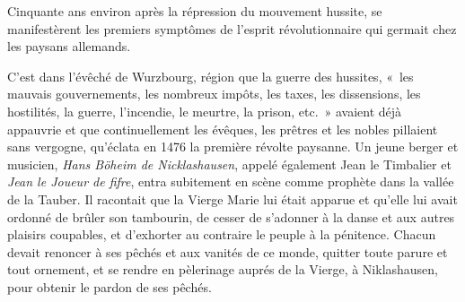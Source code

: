 \documentclass[french,twoside]{book} %
\newcommand\chaptercont{} %
\begin{document}
\chaptercont
\noindent Cinquante ans environ après la répression du mouvement hussite, se manifestèrent les premiers symptômes de l’esprit révolutionnaire qui germait chez les paysans allemands.\par
C’est dans l’évêché de Wurzbourg, région que la guerre des hussites, « les mauvais gouvernements, les nombreux impôts, les taxes, les dissensions, les hostilités, la guerre, l’incendie, le meurtre, la prison, etc. » avaient déjà appauvrie et que continuellement les évêques, les prêtres et les nobles pillaient sans vergogne, qu’éclata en 1476 la première révolte paysanne. Un jeune berger et musicien, \emph{Hans Böheim de Nicklashausen}, appelé également Jean le Timbalier et \emph{Jean le Joueur de fifre}, entra subitement en scène comme prophète dans la vallée de la Tauber. Il racontait que la Vierge Marie lui était apparue et qu’elle lui avait ordonné de brûler son tambourin, de cesser de s’adonner à la danse et aux autres plaisirs coupables, et d’exhorter au contraire le peuple à la pénitence. Chacun devait renoncer à ses pêchés et aux vanités de ce monde, quitter toute parure et tout ornement, et se rendre en pèlerinage auprés de la Vierge, à Niklashausen, pour obtenir le pardon de ses pêchés.\par
\end{document}
